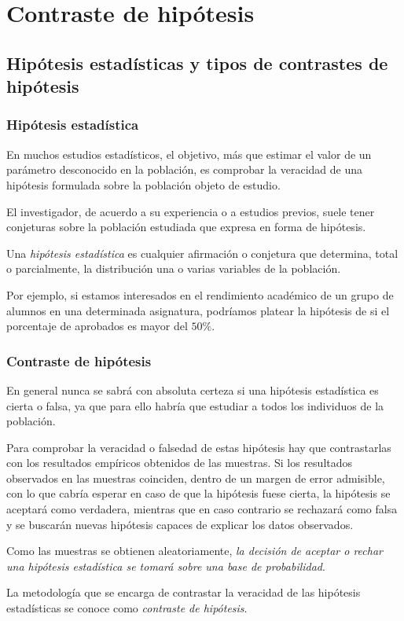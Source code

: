 \section{Contraste de hipótesis}



\subsection{Hipótesis estadísticas y tipos de contrastes de hipótesis}
\begin{frame}
\frametitle{Hipótesis estadística}
En muchos estudios estadísticos, el objetivo, más que estimar el valor de un parámetro desconocido en la población, es
comprobar la veracidad de una hipótesis formulada sobre la población objeto de estudio.

El investigador, de acuerdo a su experiencia o a estudios previos, suele tener conjeturas sobre la población estudiada
que expresa en forma de hipótesis. 

\begin{definicion}
Una \emph{hipótesis estadística} es cualquier afirmación o conjetura que determina, total o parcialmente, la
distribución una o varias variables de la población. 
\end{definicion}

Por ejemplo, si estamos interesados en el rendimiento académico de un grupo de alumnos en una determinada asignatura,
podríamos platear la hipótesis de si el porcentaje de aprobados es mayor del $50\%$. 
\end{frame}


\begin{frame}
\frametitle{Contraste de hipótesis}
En general nunca se sabrá con absoluta certeza si una hipótesis estadística es cierta o falsa, ya que para ello habría
que estudiar a todos los individuos de la población. 

Para comprobar la veracidad o falsedad de estas hipótesis hay que contrastarlas con los resultados empíricos obtenidos
de las muestras. 
Si los resultados observados en las muestras coinciden, dentro de un margen de error admisible, con lo que cabría
esperar en caso de que la hipótesis fuese cierta, la hipótesis se aceptará como verdadera, mientras que en caso
contrario se rechazará como falsa y se buscarán nuevas hipótesis capaces de explicar los datos observados.

Como las muestras se obtienen aleatoriamente, \alert{\emph{la decisión de aceptar o rechar una hipótesis estadística se
tomará sobre una base de probabilidad}}.

La metodología que se encarga de contrastar la veracidad de las hipótesis estadísticas se conoce como \emph{contraste
de hipótesis}.
\end{frame}


